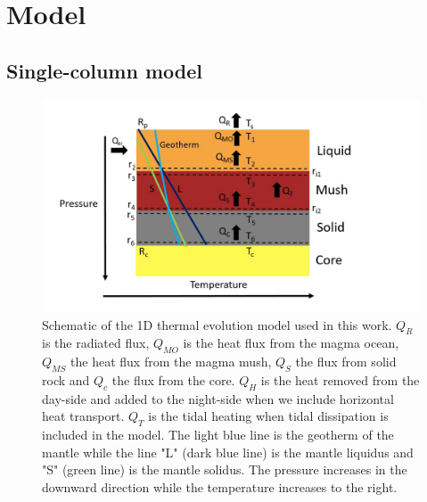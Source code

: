 \documentclass[fleqn,usenatbib]{mnras}
\begin{document}
\section{Model}  \label{sec2}


\subsection{Single-column model}  \label{sec2.1}

\begin{figure}\centering
\includegraphics[width=1.1\textwidth]{1.jpg}

\caption{Schematic of the 1D thermal evolution model used in this work. $Q_{R}$ is the radiated flux, $Q_{MO}$ is the heat flux from the magma ocean, $Q_{MS}$ the heat flux from the magma mush, $Q_{S}$ the flux from solid rock and $Q_{c}$ the flux from the core. $Q_{H}$ is the heat removed from the day-side and added to the night-side when we include horizontal heat transport. $Q_{T}$ is the tidal heating when tidal dissipation is included in the model. The light blue line is the geotherm of the mantle while the line "L" (dark blue line) is the mantle liquidus and "S" (green line) is the mantle solidus. The pressure increases in the downward direction while the temperature increases to the right.}
\label{fig1}
\end{figure}
\end{document}
